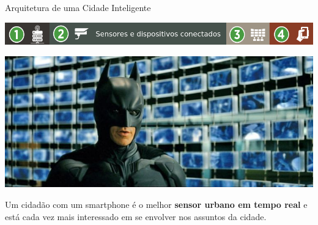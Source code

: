 \documentclass{beamer}
\begin{document}
\begin{frame}{Arquitetura de uma Cidade Inteligente}
\begin{center}
\includegraphics[width=1\textwidth]{img/arquitetura-menu-2.png}  
\end{center}
\begin{center}
 \includegraphics[width=.8\textwidth]{img/batman.jpg}

\end{center}

 


\begin{alertblock}{}
Um cidadão com um 
smartphone é o melhor {\bf{sensor urbano em tempo real}} e está cada vez mais interessado em se envolver nos assuntos da cidade.
\end{alertblock}



\end{frame}
\end{document}
